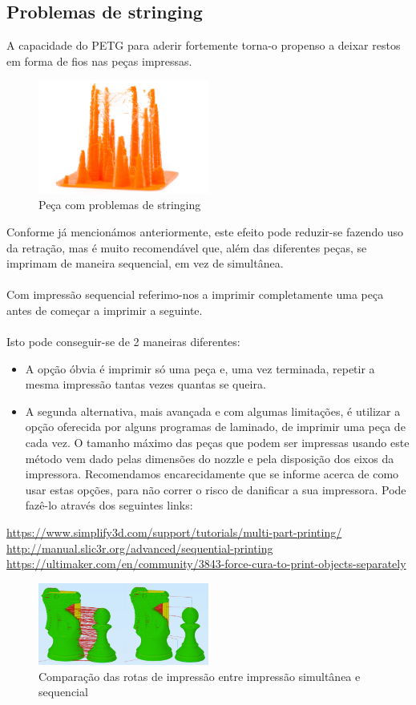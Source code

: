 \documentclass[11pt,a4paper]{article}
\begin{document}
	\subsection{Problemas de stringing}A capacidade do PETG para aderir fortemente torna-o propenso a deixar restos em forma de fios nas peças impressas.
\begin{figure}[H]
\centering
\includegraphics[width=0.5\textwidth,cfbox=azul_marcos 1pt 0pt]{FOTOS/RETRACCION1}
\caption*{Peça com problemas de stringing}
\end{figure}
Conforme já mencionámos anteriormente, este efeito pode reduzir-se fazendo uso da retração, mas é muito recomendável que, além das diferentes peças, se imprimam de maneira sequencial, em vez de simultânea.
\\\\
Com impressão sequencial referimo-nos a imprimir completamente uma peça antes de começar a imprimir a seguinte.
\\\\
Isto pode conseguir-se de 2 maneiras diferentes:
\begin{itemize}
\item A opção óbvia é imprimir só uma peça e, uma vez terminada, repetir a mesma impressão tantas vezes quantas se queira.
\item A segunda alternativa, mais avançada e com algumas limitações, é utilizar a opção oferecida por alguns programas de laminado, de imprimir uma peça de cada vez. O tamanho máximo das peças que podem ser impressas usando este método vem dado pelas dimensões do nozzle e pela disposição dos eixos da impressora. Recomendamos encarecidamente que se informe acerca de como usar estas opções, para não correr o risco de danificar a sua impressora. Pode fazê-lo através dos seguintes links:
\end{itemize}
\url{https://www.simplify3d.com/support/tutorials/multi-part-printing/}\\
\url{http://manual.slic3r.org/advanced/sequential-printing}\\
\url{https://ultimaker.com/en/community/3843-force-cura-to-print-objects-separately}
\begin{figure}[H]
\centering
\includegraphics[width=0.5\textwidth,cfbox=azul_marcos 4pt 0pt]{FOTOS/SEQUENTIALPRINTING}
\caption*{Comparação das rotas de impressão entre impressão simultânea e sequencial}
\end{figure}
\end{document}
